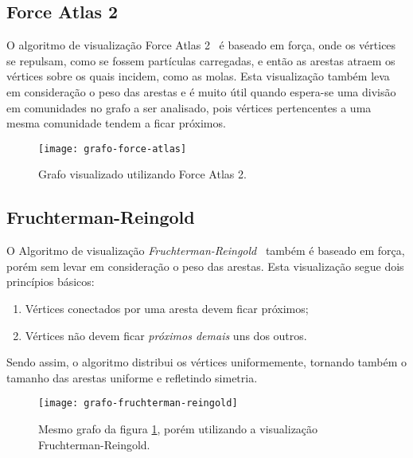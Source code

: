\subsection{Force Atlas 2}
\label{conceitos__visualizacoes--force-atlas}

O algoritmo de visualização Force Atlas 2~\cite{jacomy2014forceatlas2} é baseado em força, onde os vértices se repulsam, como se fossem partículas carregadas, e então as arestas atraem os vértices sobre os quais incidem, como as molas. Esta visualização também leva em consideração o peso das arestas e é muito útil quando espera-se uma divisão em comunidades no grafo a ser analisado, pois vértices pertencentes a uma mesma comunidade tendem a ficar próximos.

\begin{figure}[h]
\texttt{[image: grafo-force-atlas]}
\centering
\caption{
    Grafo visualizado utilizando Force Atlas 2.
}
\label{fig:grafo-force-atlas}
\end{figure}

\subsection{Fruchterman-Reingold}
\label{conceitos__visualizacoes--fruchterman-reingold}

O Algoritmo de visualização \emph{Fruchterman-Reingold}~\cite{fruchterman1991graph} também é baseado em força, porém sem levar em consideração o peso das arestas. Esta visualização segue dois princípios básicos:

\begin{enumerate}
\item Vértices conectados por uma aresta devem ficar próximos;
\item Vértices não devem ficar \emph{próximos demais} uns dos outros.
\end{enumerate}

Sendo assim, o algoritmo distribui os vértices uniformemente, tornando também o tamanho das arestas uniforme e refletindo simetria.

\begin{figure}[h]
\texttt{[image: grafo-fruchterman-reingold]}
\centering
\caption{
    Mesmo grafo da figura \ref{fig:grafo-force-atlas}, porém utilizando a visualização Fruchterman-Reingold.
}
\label{fig:grafo-fruchterman-reingold}
\end{figure}
